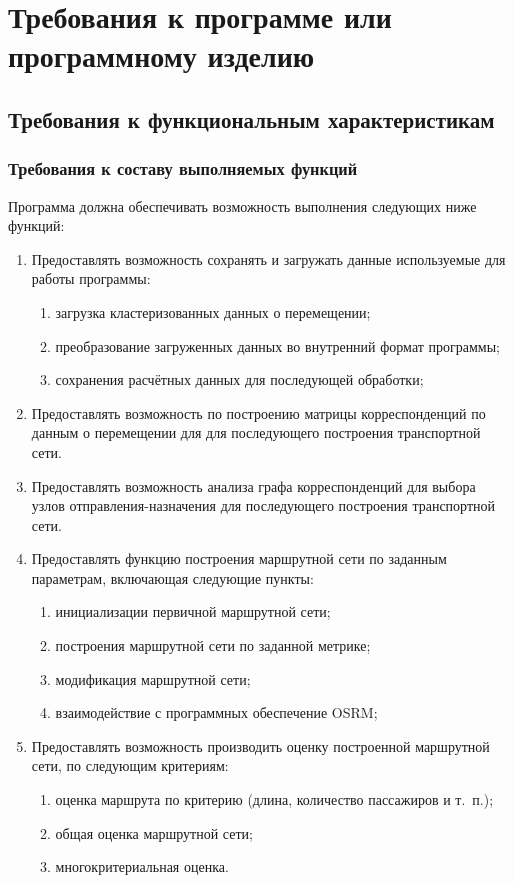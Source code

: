 \chapter{Требования к программе или программному изделию}
\section{Требования к функциональным характеристикам}
\subsection{Требования к составу выполняемых функций}
Программа должна обеспечивать возможность выполнения следующих ниже функций:
\begin{enumerate}
    \item Предоставлять возможность сохранять и загружать данные используемые для работы программы:
    \begin{enumerate}
        \item загрузка кластеризованных данных о перемещении;
        \item преобразование загруженных данных во внутренний формат программы;
        \item сохранения расчётных данных для последующей обработки;
    \end{enumerate}
    \item Предоставлять возможность по построению матрицы корреспонденций по данным о перемещении для 
        для последующего построения транспортной сети.
    \item Предоставлять возможность анализа графа корреспонденций для выбора узлов отправления-назначения для 
        последующего построения транспортной сети.
    \item Предоставлять функцию построения маршрутной сети по заданным параметрам, включающая следующие 
        пункты:
    \begin{enumerate}
        \item инициализации первичной маршрутной сети;
        \item построения маршрутной сети по заданной метрике;
        \item модификация маршрутной сети;
        \item взаимодействие с программных обеспечение OSRM;
    \end{enumerate}
    \item Предоставлять возможность производить оценку построенной маршрутной сети, по следующим критериям:
    \begin{enumerate}
        \item оценка маршрута по критерию (длина, количество пассажиров и т.~п.);
        \item общая оценка маршрутной сети;
        \item многокритериальная оценка.
    \end{enumerate}
\end{enumerate}


